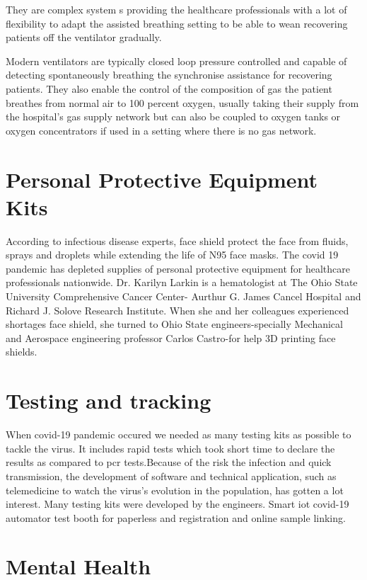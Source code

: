 \documentclass[12pt]{article}
\begin{document}
They are complex system s providing the healthcare professionals with a lot of flexibility to adapt the assisted breathing setting to be able to wean recovering patients off the ventilator gradually. 

Modern ventilators are typically closed loop pressure controlled and capable of detecting spontaneously breathing the synchronise assistance for recovering patients. They also enable the control of the composition of gas the patient breathes from normal air to 100 percent oxygen, usually taking their supply from the hospital's gas supply network but can also be coupled to oxygen tanks or oxygen concentrators if used in a setting where there is no gas network. 

\section{Personal Protective Equipment Kits}

According to infectious disease experts, face shield protect the face from fluids, sprays and droplets while extending the life of N95 face masks. The covid 19 pandemic has depleted supplies of personal protective equipment for healthcare professionals nationwide. Dr. Karilyn Larkin is a hematologist at The Ohio State University Comprehensive Cancer Center- Aurthur G. James Cancel Hospital and Richard J. Solove Research Institute. When she and her colleagues experienced shortages face shield, she turned to Ohio State engineers-specially Mechanical and Aerospace engineering professor Carlos Castro-for help 3D printing face shields.       

\section{Testing and tracking}

When covid-19 pandemic occured we needed as many testing kits as possible to tackle the virus. It includes rapid tests which took short time to declare the results as compared to pcr tests.Because of the risk the infection and quick transmission, the development of software and technical application, such  as telemedicine to watch the virus's evolution in the population, has gotten a lot interest. Many testing kits were developed by the engineers. Smart iot covid-19 automator test booth for paperless and registration and online sample linking.

\section{Mental Health} 
\end{document}

